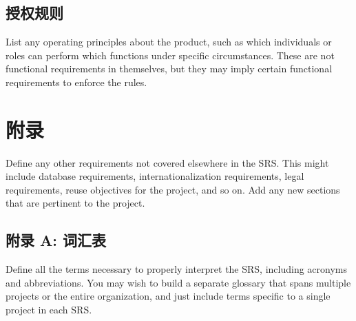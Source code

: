 \documentclass{ctexart}
\begin{document}
\subsection{授权规则}
List any operating principles about the product, such as which individuals or 
roles can perform which functions under specific circumstances. These are not 
functional requirements in themselves, but they may imply certain functional 
requirements to enforce the rules.



\section{附录}\label{S:appendix}
Define any other requirements not covered elsewhere in the SRS. This might 
include database requirements, internationalization requirements, legal 
requirements, reuse objectives for the project, and so on. Add any new sections 
that are pertinent to the project.
\subsection{附录 A: 词汇表}
Define all the terms necessary to properly interpret the SRS, including 
acronyms and abbreviations. You may wish to build a separate glossary that spans 
multiple projects or the entire organization, and just include terms specific to 
a single project in each SRS.
\end{document}
